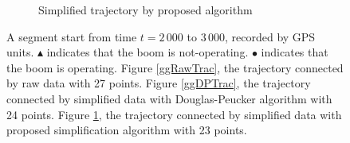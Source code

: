 \begin{figure}
\begin{subfigure}[t]{0.47\textwidth}
\caption{Simplified trajectory by proposed algorithm}\label{ggSPTrac}
\end{subfigure}
\caption{A segment start from time $t=2\,000$ to $3\,000$, recorded by GPS units. $\blacktriangle$ indicates that the boom is not-operating. $\bullet$ indicates that the boom is operating. Figure \ref{ggRawTrac}, the trajectory connected by raw data with 27 points. Figure \ref{ggDPTrac}, the trajectory connected by simplified data with Douglas-Peucker algorithm with 24 points. Figure \ref{ggSPTrac}, the trajectory connected by simplified data with proposed simplification algorithm with 23  points.}\label{DataSimpRawTra}
\end{figure}

